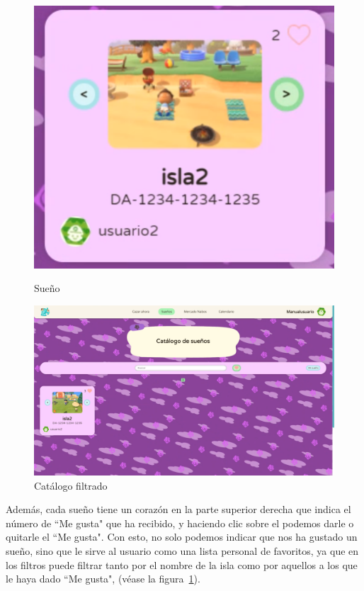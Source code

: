\begin{figure}[!htb]
	\begin{minipage}{0.48\textwidth}
		\centering
		\includegraphics[width=.7\linewidth]{img/cap9/55-sueno.png}
		\caption{Sueño}
		\label{fig:sueno}
	\end{minipage}\hfill
	\begin{minipage}{0.48\textwidth}
		\centering
		\includegraphics[width=\linewidth]{img/cap9/56-catalogo-sueno-filtro-like.png}
		\caption{Catálogo filtrado}
		\label{fig:catfiltered}
	\end{minipage}
\end{figure}

Además, cada sueño tiene un corazón en la parte superior derecha que indica el número de ``Me gusta" que ha recibido, y haciendo clic sobre el podemos darle o quitarle el ``Me gusta". Con esto, no solo podemos indicar que nos ha gustado un sueño, sino que le sirve al usuario como una lista personal de favoritos, ya que en los filtros puede filtrar tanto por el nombre de la isla como por aquellos a los que le haya dado ``Me gusta", {(v\'ease la figura~\ref{fig:catfiltered})}.\\

